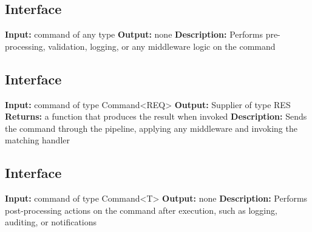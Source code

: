 \documentclass{article}
\begin{document}
\subsection{Interface}
\begin{algorithm}
\caption{CommandMiddleware Interface}
\begin{algorithmic}[1]
    \State \textbf{Input:} command of any type
    \State \textbf{Output:} none
    \State \textbf{Description:} Performs pre-processing, validation, logging, or any middleware logic on the command
\EndProcedure
\end{algorithmic}
\end{algorithm}

\subsection{Interface}
\begin{algorithm}
\caption{CommandPipeline Interface}
\begin{algorithmic}[1]
    \State \textbf{Input:} command of type Command\textless REQ\textgreater
    \State \textbf{Output:} Supplier of type RES
    \State \textbf{Returns:} a function that produces the result when invoked
    \State \textbf{Description:} Sends the command through the pipeline, applying any middleware and invoking the matching handler
\EndProcedure
\end{algorithmic}
\end{algorithm}

\subsection{Interface}
\begin{algorithm}
\caption{CommandPostProcessor Interface}
\begin{algorithmic}[1]
    \State \textbf{Input:} command of type Command\textless T\textgreater
    \State \textbf{Output:} none
    \State \textbf{Description:} Performs post-processing actions on the command after execution, such as logging, auditing, or notifications
\EndProcedure
\end{algorithmic}
\end{algorithm}
\end{document}
